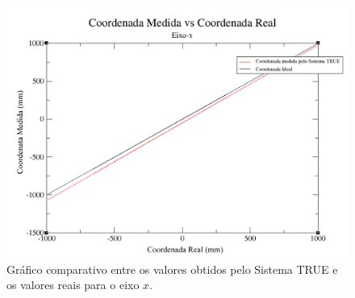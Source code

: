 	\begin{figure}[htb]
		\begin{center}
			\includegraphics[scale=0.4]{figuras/5.Testes/grafico-eixo-x.png}
		\end{center}
		\caption{Gráfico comparativo entre os valores obtidos pelo Sistema TRUE e os valores reais para o eixo $\displaystyle x$.}
		\label{fig:grafico-eixox}
	\end{figure}

































